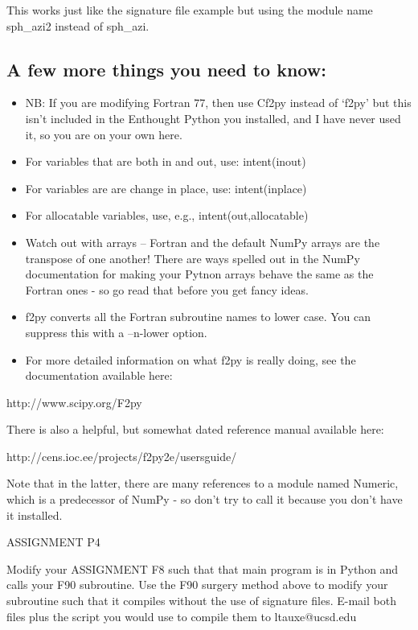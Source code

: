 {This works just like the signature file example but using the module name {\color{blue}sph\_azi2} instead of {\color{blue}sph\_azi}.    


\subsection{A few more things you need to know:}

\begin{itemize}
\item NB: If you are modifying Fortran 77, then use  {\color{blue}Cf2py} instead of `{\color{blue}f2py}' but this isn't included in the Enthought Python you installed, and I have never used it, so you are on your own here.
\item For variables that are both in and out, use:  intent(inout)
\item For variables are are change in place, use:  intent(inplace)
\item For allocatable variables, use, e.g., intent(out,allocatable)
\item Watch out with arrays -- Fortran and the default {\color{blue}NumPy} arrays are the transpose of one another!   There are ways spelled out in the {\color{blue}NumPy} documentation for making your Pytnon arrays behave the same as the Fortran ones - so go read that before you get fancy ideas.
\item {\color{blue}f2py} converts all the Fortran subroutine names to lower case.  You can suppress this with a --n-lower option.  
\item For more detailed information on what {\color{blue}f2py}  is really doing, see the documentation available here:
\end{itemize}

http://www.scipy.org/F2py

\noindent
There is also a helpful, but somewhat dated reference manual available here:

http://cens.ioc.ee/projects/f2py2e/usersguide/

\noindent Note that in the latter, there are many references to a module named {\color{blue}Numeric}, which is a predecessor of {\color{blue}NumPy} - so don't try to call it because you don't have it installed. 



\noindent
{\singlespacing \color{red} ASSIGNMENT  P4

Modify your ASSIGNMENT F8 such that that main program is in Python and calls your  F90 subroutine.  Use the F90 surgery method above to modify your subroutine such that it compiles without the use of signature files.  E-mail both files plus the script you would use to compile them to ltauxe@ucsd.edu
}

}
